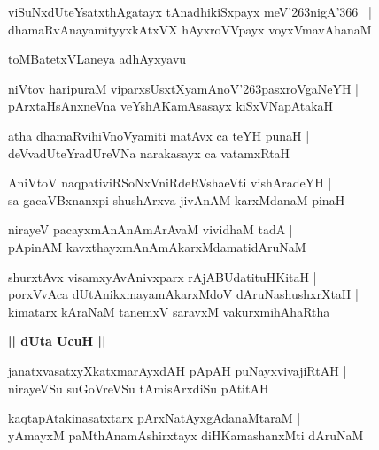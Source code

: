 \documentclass[twoside,12pt,openright]{book}
\def\S{\char'263}
\newcounter{shloka}[chapter]
\def\uvaca#1{\centerline{{\large\textbf{#1}}}}
\begin{document}
\begin{shloka}%
viSuNxdUteYsatxthAgatayx tAnadhikiSxpayx meV\S nigA\char'366 ~|\\
dhamaRvAnayamityyxkAtxVX hAyxroVVpayx voyxVmavAhanaM 
\end{shloka}

\begin{center}
toMBatetxVLaneya adhAyxyavu
\end{center}

\begin{shloka}%
niVtov haripuraM viparxsUsxtXyamAnoV\S pasxroVgaNeYH |\\
pArxtaHsAnxneVna veYshAKamAsasayx kiSxVNapAtakaH 
\end{shloka}

\begin{shloka}%
atha dhamaRvihiVnoVyamiti matAvx ca teYH punaH |\\
deVvadUteYradUreVNa narakasayx ca vatamxRtaH 
\end{shloka}

\begin{shloka}%
AniVtoV naqpativiRSoNxVniRdeRVshaeVti vishAradeYH |\\
sa gacaVBxnanxpi shushArxva jivAnAM karxMdanaM pinaH 
\end{shloka}

\begin{shloka}%
nirayeV pacayxmAnAnAmArAvaM vividhaM tadA |\\
pApinAM kavxthayxmAnAmAkarxMdamatidAruNaM 
\end{shloka}

\begin{shloka}%
shurxtAvx visamxyAvAnivxparx rAjABUdatituHKitaH |\\
porxVvAca dUtAnikxmayamAkarxMdoV dAruNashushxrXtaH |\\
kimatarx kAraNaM tanemxV saravxM vakurxmihAhaRtha
\end{shloka}

\uvaca{|| dUta UcuH ||}

\begin{shloka}%
janatxvasatxyXkatxmarAyxdAH pApAH puNayxvivajiRtAH |\\
nirayeVSu suGoVreVSu tAmisArxdiSu pAtitAH 
\end{shloka}

\begin{shloka}%
kaqtapAtakinasatxtarx pArxNatAyxgAdanaMtaraM |\\
yAmayxM paMthAnamAshirxtayx diHKamashanxMti dAruNaM 
\end{shloka}
\end{document}
